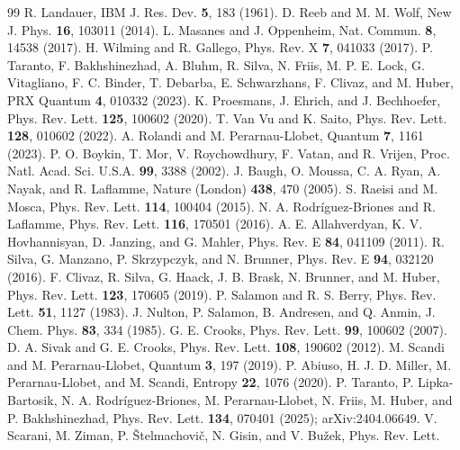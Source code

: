 \documentclass[aps,prl,reprint,superscriptaddress,amsmath,amssymb]{revtex4-2}
\begin{document}
\begin{thebibliography}{99}
 R. Landauer, IBM J. Res. Dev. \textbf{5}, 183 (1961).
 D. Reeb and M. M. Wolf, New J. Phys. \textbf{16}, 103011 (2014).
 L. Masanes and J. Oppenheim, Nat. Commun. \textbf{8}, 14538 (2017).
 H. Wilming and R. Gallego, Phys. Rev. X \textbf{7}, 041033 (2017).
 P. Taranto, F. Bakhshinezhad, A. Bluhm, R. Silva, N. Friis, M. P. E. Lock, G. Vitagliano,
F. C. Binder, T. Debarba, E. Schwarzhans, F. Clivaz, and M. Huber, PRX Quantum \textbf{4}, 010332 (2023).
 K. Proesmans, J. Ehrich, and J. Bechhoefer, Phys. Rev. Lett. \textbf{125}, 100602 (2020).
 T. Van Vu and K. Saito, Phys. Rev. Lett. \textbf{128}, 010602 (2022).
 A. Rolandi and M. Perarnau-Llobet, Quantum \textbf{7}, 1161 (2023).
 P. O. Boykin, T. Mor, V. Roychowdhury, F. Vatan, and R. Vrijen, Proc. Natl. Acad. Sci. U.S.A.
\textbf{99}, 3388 (2002).
 J. Baugh, O. Moussa, C. A. Ryan, A. Nayak, and R. Laflamme, Nature (London) \textbf{438}, 470
(2005).
 S. Raeisi and M. Mosca, Phys. Rev. Lett. \textbf{114}, 100404 (2015).
 N. A. Rodr\'iguez-Briones and R. Laflamme, Phys. Rev. Lett. \textbf{116}, 170501 (2016).
 A. E. Allahverdyan, K. V. Hovhannisyan, D. Janzing, and G. Mahler, Phys. Rev. E \textbf{84},
041109 (2011).
 R. Silva, G. Manzano, P. Skrzypczyk, and N. Brunner, Phys. Rev. E \textbf{94}, 032120 (2016).
 F. Clivaz, R. Silva, G. Haack, J. B. Brask, N. Brunner, and M. Huber, Phys. Rev. Lett.
\textbf{123}, 170605 (2019).
 P. Salamon and R. S. Berry, Phys. Rev. Lett. \textbf{51}, 1127 (1983).
 J. Nulton, P. Salamon, B. Andresen, and Q. Anmin, J. Chem. Phys. \textbf{83}, 334 (1985).
 G. E. Crooks, Phys. Rev. Lett. \textbf{99}, 100602 (2007).
 D. A. Sivak and G. E. Crooks, Phys. Rev. Lett. \textbf{108}, 190602 (2012).
 M. Scandi and M. Perarnau-Llobet, Quantum \textbf{3}, 197 (2019).
 P. Abiuso, H. J. D. Miller, M. Perarnau-Llobet, and M. Scandi, Entropy \textbf{22}, 1076 (2020).
 P. Taranto, P. Lipka-Bartosik, N. A. Rodr\'iguez-Briones, M. Perarnau-Llobet, N. Friis, M. Huber, and
P. Bakhshinezhad, Phys. Rev. Lett. \textbf{134}, 070401 (2025); arXiv:2404.06649.
 V. Scarani, M. Ziman, P. \v{S}telmachovi\v{c}, N. Gisin, and V. Bu\v{z}ek, Phys. Rev. Lett.

\end{thebibliography}
\end{document}
